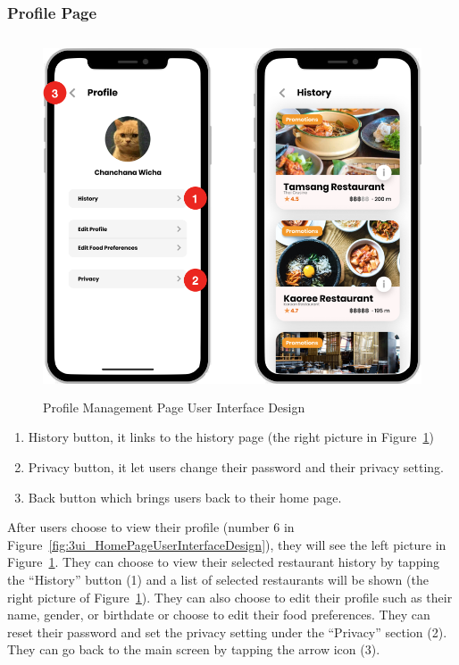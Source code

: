 \documentclass[12pt,oneside,openright,a4paper]{cpe-english-project}
\begin{document}
\newpage
\subsubsection{Profile Page}
\begin{figure}[H]\centering
\includegraphics[height=300pt]{./images/3ui_ProfileManagementPageUserInterfaceDesign.png}
\caption{Profile Management Page User Interface Design}\label{fig:3ui_ProfileManagementPageUserInterfaceDesign}
\end{figure}\vspace{-24pt}

\begin{enumerate}
\item History button, it links to the history page (the right picture in Figure~\ref{fig:3ui_ProfileManagementPageUserInterfaceDesign})
\item Privacy button, it let users change their password and their privacy setting.
\item Back button which brings users back to their home page.
\end{enumerate}

After users choose to view their profile (number 6 in Figure~\ref{fig:3ui_HomePageUserInterfaceDesign}), they will see the left picture in Figure~\ref{fig:3ui_ProfileManagementPageUserInterfaceDesign}. They can choose to view their selected restaurant history by tapping the “History” button (1) and a list of selected restaurants will be shown (the right picture of Figure~\ref{fig:3ui_ProfileManagementPageUserInterfaceDesign}). They can also choose to edit their profile such as their name, gender, or birthdate or choose to edit their food preferences. They can reset their password and set the privacy setting under the “Privacy” section (2). They can go back to the main screen by tapping the arrow icon (3).
\end{document}
